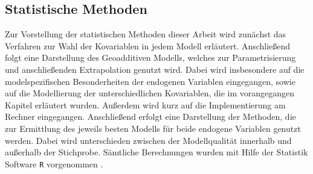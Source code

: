 \documentclass{Vorlage}
\begin{document}
\begin{table}[h]
\centering
\caption{Sozioökonomische und geographische Variablen der Gebäude- und Wohnungszählung im Rahmen des Zensus und deren Anzahl der Ausprägungen.}
\label{Var_Zensus}
\end{table}

\newpage

\subsection{Statistische Methoden}

Zur Vorstellung der statistischen Methoden dieser Arbeit wird zunächst das Verfahren zur Wahl der Kovariablen in jedem Modell erläutert. Anschließend folgt eine Darstellung des Geoadditiven Modells, welches zur Parametrisierung und anschließenden Extrapolation genutzt wird. Dabei wird insbesondere auf die modelspezifischen Besonderheiten der endogenen Variablen eingegangen, sowie auf die Modellierung der unterschiedlichen Kovariablen, die im vorangegangen Kapitel erläutert wurden. Außerdem wird kurz auf die Implementierung am Rechner eingegangen. Anschließend erfolgt eine Darstellung der Methoden, die zur Ermittlung des jeweils besten Modells für beide endogene Variablen genutzt werden. Dabei wird unterschieden zwischen der Modellqualität innerhalb und außerhalb der Stichprobe. Sämtliche Berechnungen wurden mit Hilfe der Statistik Software \texttt{R} vorgenommen \cite{RCore}.
\end{document}
